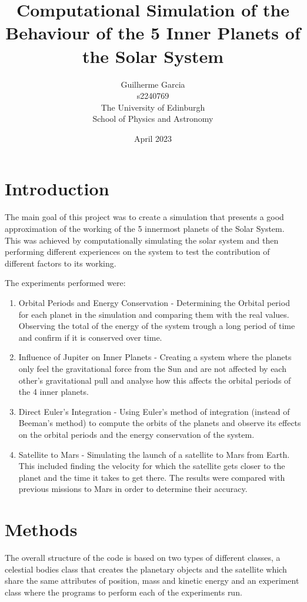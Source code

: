 \documentclass{article}
\title{Computational Simulation of the Behaviour of the 5 Inner Planets of the Solar System}
\author{Guilherme Garcia \\ s2240769 \\ The University of Edinburgh \\ School of Physics and Astronomy}
\date{April 2023 }
\begin{document}
\maketitle

\section{Introduction}

{The main goal of this project was to create a simulation that presents a good approximation of the working of the 5 innermost planets of the Solar System. This was achieved by computationally simulating the solar system and then performing different experiences on the system to test the contribution of different factors to its working.}

{The experiments performed were:}

\begin{enumerate}
  \item Orbital Periods and Energy Conservation - Determining the Orbital period for each planet in the simulation and comparing them with the real values. Observing the total of the energy of the system trough a long period of time and confirm if it is conserved over time. 
  \item Influence of Jupiter on Inner Planets - Creating a system where the planets only feel the gravitational force from the Sun and are not affected by each other's gravitational pull and analyse how this affects the orbital periods of the 4 inner planets. 
  \item Direct Euler's Integration - Using Euler's method of integration (instead of Beeman's method) to compute the orbits of the planets and observe its effects on the orbital periods and the energy conservation of the system.
  \item Satellite to Mars - Simulating the launch of a satellite to Mars from Earth. This included finding the velocity for which the satellite gets closer to the planet and the time it takes to get there. The results were compared with previous missions to Mars in order to determine their accuracy.
  
\end{enumerate}

\section{Methods}

{The overall structure of the code is based on two types of different classes, a celestial bodies class that creates the planetary objects and the satellite which share the same attributes of position, mass and kinetic energy and an experiment class where the programs to perform each of the experiments run.}
\end{document}
